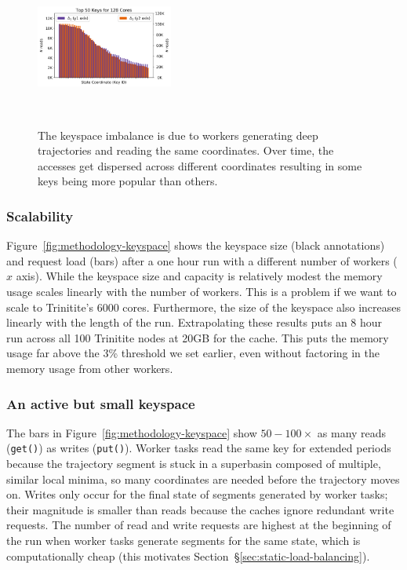 \begin{figure}[t]
  \noindent\includegraphics[height=4.5cm,width=0.4\textwidth]{figures/methodology-keys.png}\\
  \caption{The keyspace imbalance is due to workers generating deep
  trajectories and reading the same coordinates. Over time, the accesses get
  dispersed across different coordinates resulting in some keys being more
  popular than others.\label{fig:methodology-keys}}
\end{figure}

\subsubsection*{Scalability} Figure~\ref{fig:methodology-keyspace} shows the
keyspace size (black annotations) and request load (bars) after a one hour run
with a different number of workers (\(x\) axis). While the keyspace size and
capacity is relatively modest the memory usage scales linearly with the number
of workers. This is a problem if we want to scale to Trinitite's 6000 cores.
Furthermore, the size of the keyspace also increases linearly with the length
of the run.  Extrapolating these results puts an 8 hour run across all 100
Trinitite nodes at 20GB for the cache.  This puts the memory usage far above
the 3\% threshold we set earlier, even without factoring in the memory usage
from other workers.

\subsubsection*{An active but small keyspace} The bars in
Figure~\ref{fig:methodology-keyspace} show \(50-100\times\) as many reads
(\texttt{get()}) as writes (\texttt{put()}).  Worker tasks read the same key
for extended periods because the trajectory segment is stuck in a superbasin
composed of multiple, similar local minima, so many coordinates are needed before the trajectory
moves on. Writes only occur for the final state of segments generated by worker
tasks; their magnitude is smaller than reads because the caches ignore
redundant write requests. The number of read and write requests are highest at
the beginning of the run when worker tasks generate segments for the same
state, which is computationally cheap (this motivates
Section~\S\ref{sec:static-load-balancing}).

